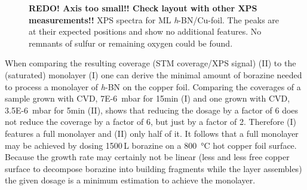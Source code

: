 \begin{figure}[ht]
\centering
{}
\caption{\textbf{REDO! Axis too small!! Check layout with other XPS measurements!!} XPS spectra for ML \textit{h}-BN/Cu-foil. The peaks are at their expected positions\cite{kidambi_situ_2014} and show no additional features. No remnants of sulfur or remaining oxygen could be found.}
\label{fig:xps-self-grown}
\end{figure}

When comparing the resulting coverage (STM coverage/XPS signal) (II) to the (saturated) monolayer (I) one can derive the minimal amount of borazine needed to process a monolayer of \textit{h}-BN on the copper foil. Comparing the coverages of a sample grown with CVD, \SI{7E-6}{\milli \bar} for 15min (I) and one grown with CVD, \SI{3.5E-6}{\milli \bar} for 5min (II), shows that reducing the dosage by a factor of 6 does not reduce the coverage by a factor of 6, but just by a factor of 2. Therefore (I) features a full monolayer and (II) only half of it. It follows that a full monolayer may be achieved by dosing 1500\,L borazine on a \SI{800}{\degreeCelsius} hot copper foil surface. 
Because the growth rate may certainly not be linear (less and less free copper surface to decompose borazine into building fragments while the layer assembles) the given dosage is a minimum estimation to achieve the monolayer.

